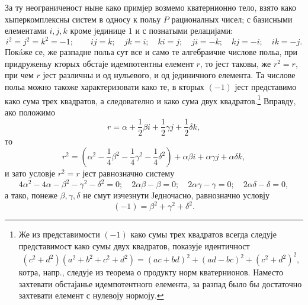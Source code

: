 ﻿\documentclass[11pt]{article}
\begin{document}
\noindent За ту неограниченост ныне како примјер возмемо кватернионно тело, взято како хыперкомплексны систем в односу к польу $P$ рационалных чисел; с базисными елементами $i,j,k$ кроме јединице $1$ и с познатыми релацијами:
\[
 i^2=j^2=k^2=-1;\qquad ij=k;\quad jk=i;\quad ki=j;\quad ji=-k;\quad kj=-i;\quad ik=-j.
\]
Покáже се, же разпадне польа сут все и само те алгебраичне числове польа, при придруженьу кторых обстаје идемпотентны елемент $r$, то јест таковы, же $r^2=r$, при чем $r$ јест различны и од нульевого, и од јединичного елемента. Та числове польа можно такоже характеризовати како те, в кторых $(-1)$ јест представимо како сума трех квадратов, а следователно и како сума двух квадратов.\footnote{Же из представимости $(-1)$ како сумы трех квадратов всегда следује представимост како сумы двух квадратов, показује идентичност
\[
(c^2+d^2)(a^2+b^2+c^2+d^2)=(ac+bd)^2+(ad-bc)^2+(c^2+d^2)^2,
\]
котра, напр., следује из теорема о продукту норм кватернионов. Наместо захтевати обстајанье идемпотентного елемента, за разпад было бы достаточно захтевати елемент с нулевоју нормоју.} Вправду, ако положимо
\[
        r=\alpha+\frac12\beta i+\frac12\gamma j+\frac12\delta k,
\]
то
\[
        r^2=\left(\alpha^2-\frac14\beta^2-\frac14\gamma^2-\frac14\delta^2\right)
          +\alpha\beta i+\alpha\gamma j+\alpha\delta k,
\]
и зато условје $r^2=r$ јест равнозначно систему
\[
4\alpha^2-4\alpha-\beta^2-\gamma^2-\delta^2=0;\quad
2\alpha\beta-\beta=0;\quad 2\alpha\gamma-\gamma=0;\quad 2\alpha\delta-\delta=0,
\]
а тако, понеже $\beta,\gamma,\delta$ не смут изчезнути Једночасно, равнозначно условју
\[
        (-1)=\beta^2+\gamma^2+\delta^2.
\]
\end{document}
